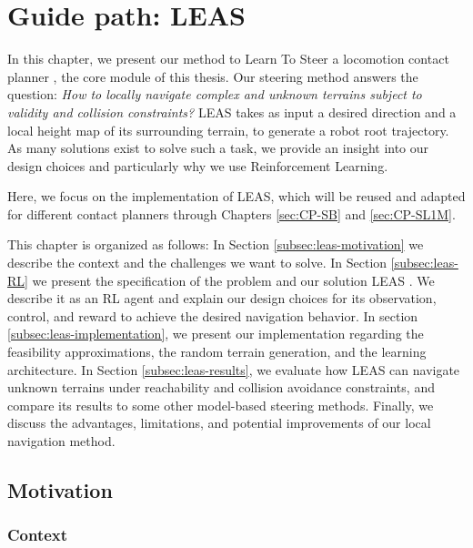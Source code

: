 

\chapter{Guide path: LEAS}
\label{sec:LEAS}
\minitoc
\bigskip

In this chapter, we present our method to Learn To Steer a locomotion contact planner , the core module of this thesis. 
Our steering method answers the question: \textit{How to locally navigate complex and unknown terrains subject to validity and collision constraints?}
LEAS takes as input a desired direction and a local height map of its surrounding terrain, to generate a robot root trajectory.
As many solutions exist to solve such a task, we provide an insight into our design choices and particularly why we use Reinforcement Learning.

Here, we focus on the implementation of LEAS, which will be reused and adapted for different contact planners through Chapters \ref{sec:CP-SB} and \ref{sec:CP-SL1M}.

This chapter is organized as follows: 
In Section \ref{subsec:leas-motivation} we describe the context and the challenges we want to solve. In Section \ref{subsec:leas-RL} we present the specification of the problem and our solution LEAS \cite{LEAS}. We describe it as an RL agent and explain our design choices for its observation, control, and reward to achieve the desired navigation behavior.
In section \ref{subsec:leas-implementation}, we present our implementation regarding the feasibility approximations, the random terrain generation, and the learning architecture.
In Section \ref{subsec:leas-results}, we evaluate how LEAS can navigate unknown terrains under reachability and collision avoidance constraints, and compare its results to some other model-based steering methods.
Finally, we discuss the advantages, limitations, and potential improvements of our local navigation method.

\section{Motivation\label{subsec:leas-motivation}}
\subsection{Context\label{subsubsec:context}}

